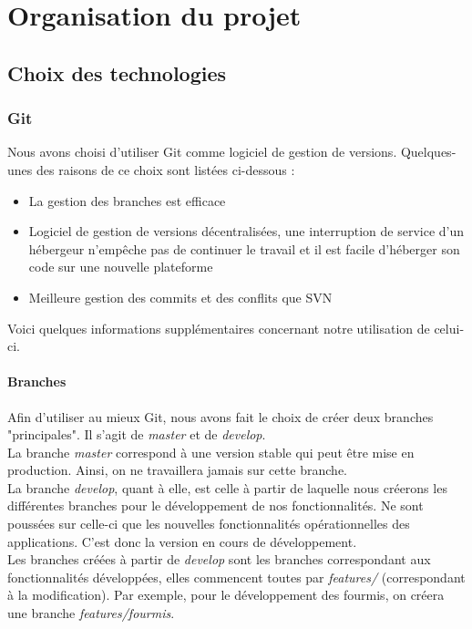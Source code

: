 \chapter{Organisation du projet}

	\section{Choix des technologies}

		\subsection{Git}

			Nous avons choisi d'utiliser Git comme logiciel de gestion de versions. Quelques-unes des raisons de ce choix sont listées ci-dessous :

			\begin{itemize}
				\item{La gestion des branches est efficace}
				\item{Logiciel de gestion de versions décentralisées, une interruption de service d'un hébergeur n'empêche pas de continuer le travail et il est facile d'héberger son code sur une nouvelle plateforme}
				\item{Meilleure gestion des commits et des conflits que SVN}
			\end{itemize}

			Voici quelques informations supplémentaires concernant notre utilisation de celui-ci.

			\subsubsection{Branches}

				Afin d'utiliser au mieux Git, nous avons fait le choix de créer deux branches "principales". Il s'agit de \textit{master} et de \textit{develop}.\\
				La branche \textit{master} correspond à une version stable qui peut être mise en production. Ainsi, on ne travaillera jamais sur cette branche.\\
				La branche \textit{develop}, quant à elle, est celle à partir de laquelle nous créerons les différentes branches pour le développement de nos fonctionnalités. Ne sont poussées sur celle-ci que les nouvelles fonctionnalités opérationnelles des applications. C'est donc la version en cours de développement.\\
				Les branches créées à partir de \textit{develop} sont les branches correspondant aux fonctionnalités développées, elles commencent toutes par \textit{features/} (correspondant à la modification). Par exemple, pour le développement des fourmis, on créera une branche \textit{features/fourmis}.

